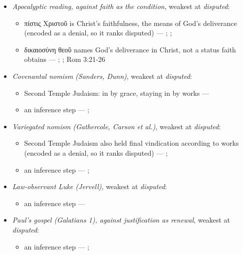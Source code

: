 \documentclass[11pt]{article}
\begin{document}
\begin{itemize}
\begin{itemize}
\item an inference step --- \cite[Trent, Session VI (1547), canon 9]{tanner-decrees-1990}
\end{itemize}
\item \emph{Apocalyptic reading, against faith as the condition}, weakest at \emph{disputed}:
\begin{itemize}
\item πίστις Χριστοῦ is Christ's faithfulness, the means of God's deliverance (encoded as a denial, so it ranks disputed) --- \cite{campbell-deliverance-god-2009}; \cite[ad loc. Gal 2:16]{martyn-galatians-1997}; \cite{hays-faith-jesus-christ-2002}
\item δικαιοσύνη θεοῦ names God's deliverance in Christ, not a status faith obtains --- \cite{campbell-deliverance-god-2009}; \cite{martyn-galatians-1997}; Rom 3:21-26
\end{itemize}
\item \emph{Covenantal nomism (Sanders, Dunn)}, weakest at \emph{disputed}:
\begin{itemize}
\item Second Temple Judaism: in by grace, staying in by works --- \cite{sanders-paul-palestinian-judaism-1977}
\item an inference step --- \cite{dunn-new-perspective-2005}; \cite{wright-what-paul-said-1997}
\end{itemize}
\item \emph{Variegated nomism (Gathercole, Carson et al.)}, weakest at \emph{disputed}:
\begin{itemize}
\item Second Temple Judaism also held final vindication according to works (encoded as a denial, so it ranks disputed) --- \cite{gathercole-where-boasting-2002}; \cite{carson-variegated-nomism-1-2001}
\item an inference step --- \cite{gathercole-where-boasting-2002}; \cite{carson-variegated-nomism-1-2001}
\end{itemize}
\item \emph{Law-observant Luke (Jervell)}, weakest at \emph{disputed}:
\begin{itemize}
\item an inference step --- \cite{jervell-luke-people-god-1972}
\end{itemize}
\item \emph{Paul's gospel (Galatians 1), against justification as renewal}, weakest at \emph{disputed}:
\begin{itemize}
\item an inference step --- \cite[ad loc. Gal 1:6]{moo-galatians-2013}; \cite[XI.1]{westminster-confession-1647}

\end{itemize}
\end{itemize}
\end{document}
